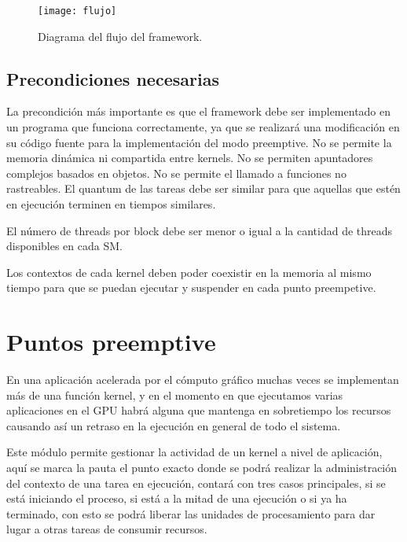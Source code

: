   \begin{figure}[ht]
      \centering
        \texttt{[image: flujo]}
        \caption{Diagrama del flujo del framework.}
        \label{fig:flujo}
    \end{figure}

\subsection{Precondiciones necesarias} \label{secc:precondiciones}
La precondición más importante es que el framework debe ser implementado en un programa que funciona correctamente, ya que se realizará una modificación en su código fuente para la implementación del modo preemptive.
No se permite la memoria dinámica ni compartida entre kernels.
No se permiten apuntadores complejos basados en objetos.
No se permite el llamado a funciones no rastreables.
El quantum de las tareas debe ser similar para que aquellas que estén en ejecución terminen en tiempos similares.
\newline

El número de threads por block debe ser menor o igual a la cantidad de threads disponibles en cada SM.
\newline

Los contextos de cada kernel deben poder coexistir en la memoria al mismo tiempo para que se puedan ejecutar y suspender en cada punto preempetive.

\section{Puntos preemptive}\label{secc:puntosPreemptive}


En una aplicación acelerada por el cómputo gráfico muchas veces se implementan más de una función kernel, y en el momento en que ejecutamos varias aplicaciones en el GPU habrá alguna que mantenga en sobretiempo los recursos causando así un retraso en la ejecución en general de todo el sistema.
\newline

Este módulo permite gestionar la actividad de un kernel a nivel de aplicación, aquí se marca la pauta el punto exacto donde se podrá realizar la administración del contexto de una tarea en ejecución, contará con tres casos principales, si se está iniciando el proceso, si está a la mitad de una ejecución o si ya ha terminado, con esto se podrá liberar las unidades de procesamiento para dar lugar a otras tareas de consumir recursos.
\newline


